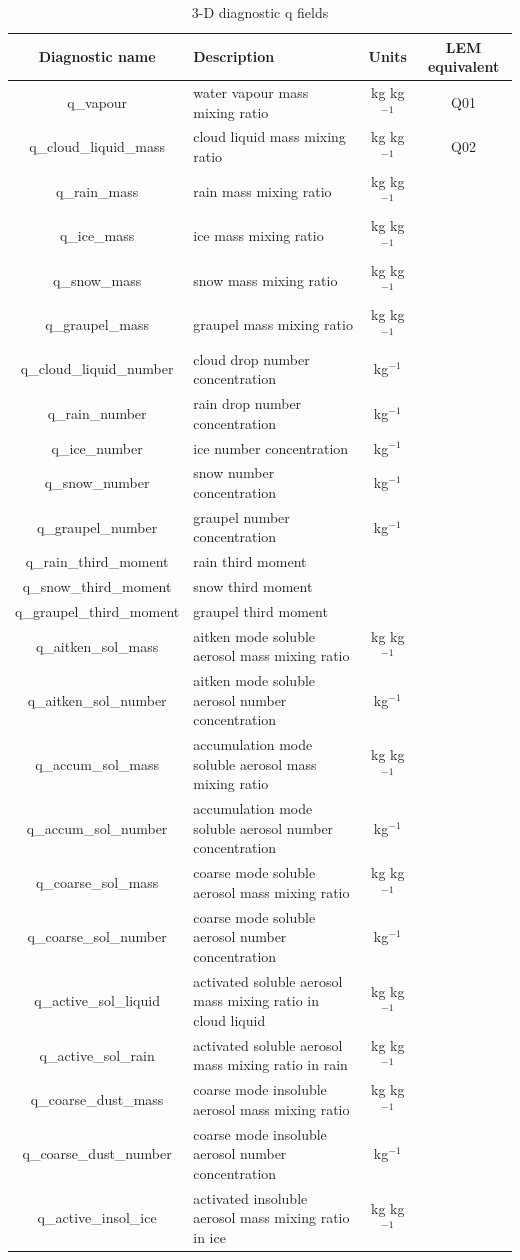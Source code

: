 \documentclass[a4paper,11pt]{article}
\begin{document}
\begin{table}[H]
  \protect\caption{3-D diagnostic q fields}
\label{tab:3d-fields}
\begin{tabular}{|c|p{7cm}|c|c|}
\hline
 Diagnostic name & Description & Units & LEM equivalent \tabularnewline
\hline
q\_vapour & water vapour mass mixing ratio & kg kg$^{-1}$ & Q01 \tabularnewline
\hline
q\_cloud\_liquid\_mass & cloud liquid mass mixing ratio & kg kg$^{-1}$ & Q02 \tabularnewline
\hline
q\_rain\_mass & rain mass mixing ratio & kg kg$^{-1}$ &  \tabularnewline
\hline
q\_ice\_mass & ice mass mixing ratio & kg kg$^{-1}$ &  \tabularnewline
\hline
q\_snow\_mass & snow mass mixing ratio & kg kg$^{-1}$ &  \tabularnewline
\hline
q\_graupel\_mass & graupel mass mixing ratio & kg kg$^{-1}$ &  \tabularnewline
\hline
q\_cloud\_liquid\_number & cloud drop number concentration & kg$^{-1}$ & \tabularnewline
\hline
q\_rain\_number & rain drop number concentration & kg$^{-1}$ & \tabularnewline
\hline
q\_ice\_number & ice number concentration & kg$^{-1}$ & \tabularnewline
\hline
q\_snow\_number & snow number concentration & kg$^{-1}$ & \tabularnewline
\hline
q\_graupel\_number & graupel number concentration & kg$^{-1}$ & \tabularnewline
\hline
q\_rain\_third\_moment & rain third moment &  & \tabularnewline
\hline
q\_snow\_third\_moment & snow third moment &  & \tabularnewline
\hline
q\_graupel\_third\_moment & graupel third moment &  & \tabularnewline
\hline
q\_aitken\_sol\_mass & aitken mode soluble aerosol mass mixing ratio & kg kg$^{-1}$ & \tabularnewline
\hline
q\_aitken\_sol\_number & aitken mode soluble aerosol number concentration & kg$^{-1}$ & \tabularnewline
\hline
q\_accum\_sol\_mass & accumulation mode soluble aerosol mass mixing ratio & kg kg$^{-1}$ & \tabularnewline
\hline
q\_accum\_sol\_number & accumulation mode soluble aerosol number concentration & kg$^{-1}$ & \tabularnewline
\hline
q\_coarse\_sol\_mass & coarse mode soluble aerosol mass mixing ratio & kg kg$^{-1}$ & \tabularnewline
\hline
q\_coarse\_sol\_number & coarse mode soluble aerosol number concentration & kg$^{-1}$ & \tabularnewline
\hline
q\_active\_sol\_liquid & activated soluble aerosol mass mixing ratio in cloud liquid & kg kg$^{-1}$ & \tabularnewline
\hline
q\_active\_sol\_rain & activated soluble aerosol mass mixing ratio in rain & kg kg$^{-1}$ & \tabularnewline
\hline
q\_coarse\_dust\_mass & coarse mode insoluble aerosol mass mixing ratio & kg kg$^{-1}$ & \tabularnewline
\hline
q\_coarse\_dust\_number & coarse mode insoluble aerosol number concentration & kg$^{-1}$ & \tabularnewline
\hline
q\_active\_insol\_ice & activated insoluble aerosol mass mixing ratio in ice & kg kg$^{-1}$ & \tabularnewline

\end{tabular}
\end{table}
\end{document}
